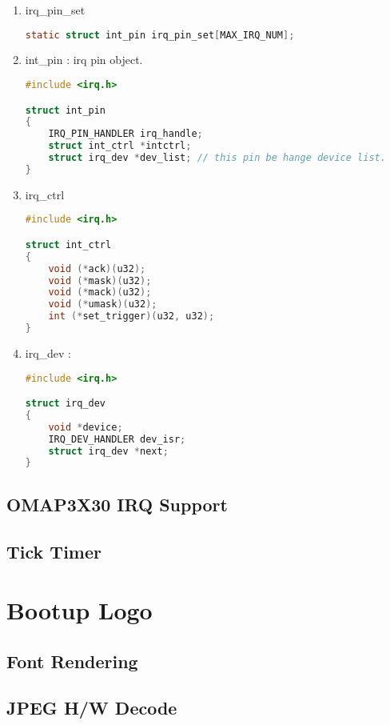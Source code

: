 \documentclass[a4paper,11pt]{book}
\begin{document}
\begin{enumerate}
\item irq\_pin\_set
\begin{lstlisting}[language=c, numbers=none]
	static struct int_pin irq_pin_set[MAX_IRQ_NUM];
\end{lstlisting}

\item int\_pin : irq pin object.
\begin{lstlisting}[language=c, numbers=none]
#include <irq.h>

struct int_pin
{
	IRQ_PIN_HANDLER irq_handle;
	struct int_ctrl *intctrl;
	struct irq_dev *dev_list; // this pin be hange device list.
}
\end{lstlisting}

\item irq\_ctrl
\begin{lstlisting}[language=c, numbers=none]
#include <irq.h>

struct int_ctrl
{
	void (*ack)(u32);
	void (*mask)(u32);
	void (*mack)(u32);
	void (*umask)(u32);
	int (*set_trigger)(u32, u32);
}
\end{lstlisting}

\item irq\_dev :
\begin{lstlisting}[language=c, numbers=none]
#include <irq.h>

struct irq_dev
{
	void *device;
	IRQ_DEV_HANDLER dev_isr;
	struct irq_dev *next;
}
\end{lstlisting}
\end{enumerate}

\section{OMAP3X30 IRQ Support}

\section{Tick Timer}

\chapter{Bootup Logo}

\section{Font Rendering}

\section{JPEG H/W Decode}
\end{document}
